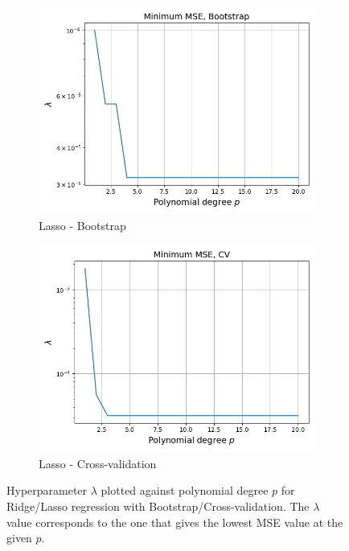 \documentclass[a4paper]{article}
\begin{document}
\begin{figure}[H]
\begin{subfigure}{0.49\textwidth}
    \includegraphics[scale=0.45]{../figures/task_e/degree_lambda_N529_pmax20_nlamb15_noise0.05_seed4155_Lasso_boot_Nbs264.png}
    \caption{Lasso - Bootstrap}
  \end{subfigure}
  \begin{subfigure}{0.49\textwidth}
    \includegraphics[scale=0.45]{../figures/task_e/degree_lambda_N529_pmax20_nlamb15_noise0.05_seed4155_Lasso_cv_k5.png}
    \caption{Lasso - Cross-validation}
  \end{subfigure}
  \caption{Hyperparameter $\lambda$ plotted against polynomial degree $p$ for Ridge/Lasso regression with Bootstrap/Cross-validation. The $\lambda$ value corresponds to the one that gives the lowest MSE value at the given $p$.}
  \label{fig:franke_lambdap}
\end{figure}
\end{document}
